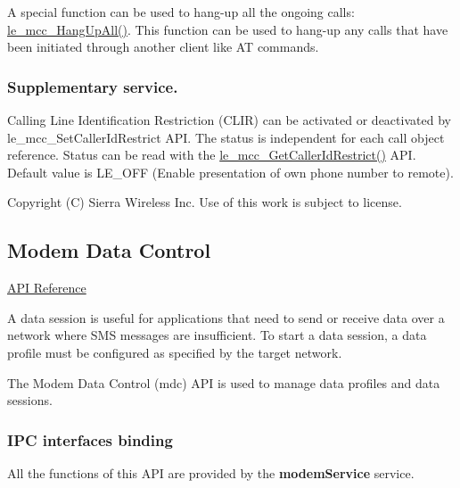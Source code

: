 A special function can be used to hang-\/up all the ongoing calls\+: \hyperlink{le__mcc__interface_8h_a38ac8543a579ecc81430c121a64bd346}{le\+\_\+mcc\+\_\+\+Hang\+Up\+All()}. This function can be used to hang-\/up any calls that have been initiated through another client like A\+T commands.\hypertarget{c_mcc_le_mcc_ss}{}\subsubsection{Supplementary service.}\label{c_mcc_le_mcc_ss}
Calling Line Identification Restriction (C\+L\+I\+R) can be activated or deactivated by le\+\_\+mcc\+\_\+\+Set\+Caller\+Id\+Restrict A\+P\+I. The status is independent for each call object reference. Status can be read with the \hyperlink{le__mcc__interface_8h_a54093f7d51cae9a186a97aa799ac3ddc}{le\+\_\+mcc\+\_\+\+Get\+Caller\+Id\+Restrict()} A\+P\+I. Default value is L\+E\+\_\+\+O\+F\+F (Enable presentation of own phone number to remote).





Copyright (C) Sierra Wireless Inc. Use of this work is subject to license. \hypertarget{c_mdc}{}\subsection{Modem Data Control}\label{c_mdc}
\hyperlink{le__mdc__interface_8h}{A\+P\+I Reference}





A data session is useful for applications that need to send or receive data over a network where S\+M\+S messages are insufficient. To start a data session, a data profile must be configured as specified by the target network.

The Modem Data Control (mdc) A\+P\+I is used to manage data profiles and data sessions.\hypertarget{c_mdc_le_mdc_binding}{}\subsubsection{I\+P\+C interfaces binding}\label{c_mdc_le_mdc_binding}
All the functions of this A\+P\+I are provided by the {\bfseries modem\+Service} service.

